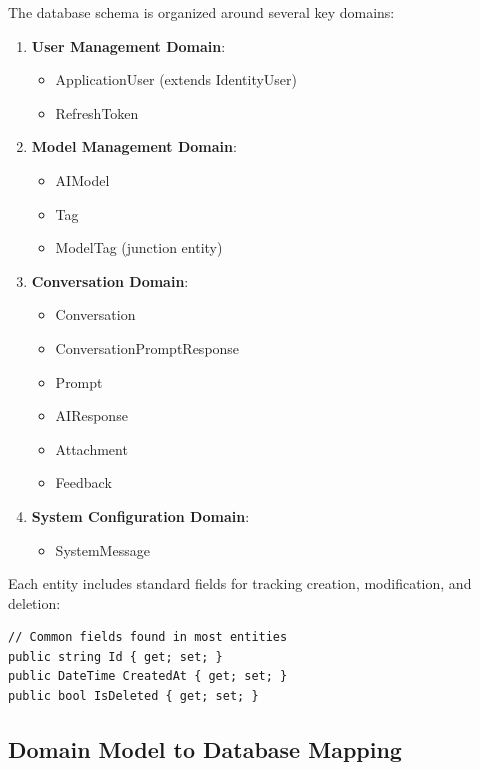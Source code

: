 The database schema is organized around several key domains:

\begin{enumerate}
   \item \textbf{User Management Domain}:
   \begin{itemize}
      \item ApplicationUser (extends IdentityUser)
      \item RefreshToken
   \end{itemize}

   \item \textbf{Model Management Domain}:
   \begin{itemize}
      \item AIModel
      \item Tag
      \item ModelTag (junction entity)
   \end{itemize}

   \item \textbf{Conversation Domain}:
   \begin{itemize}
      \item Conversation
      \item ConversationPromptResponse
      \item Prompt
      \item AIResponse
      \item Attachment
      \item Feedback
   \end{itemize}

   \item \textbf{System Configuration Domain}:
   \begin{itemize}
      \item SystemMessage
   \end{itemize}
\end{enumerate}

Each entity includes standard fields for tracking creation, modification, and deletion:

\begin{verbatim}
// Common fields found in most entities
public string Id { get; set; }
public DateTime CreatedAt { get; set; }
public bool IsDeleted { get; set; }
\end{verbatim}

\subsection{Domain Model to Database Mapping}

